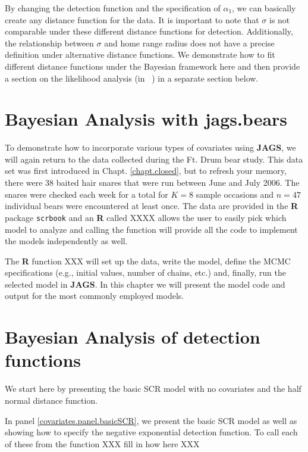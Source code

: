 By changing the detection function and the specification of
$\alpha_1$, we can basically create any distance function for the
data. It is important to note that $\sigma$ is not comparable under
these different distance functions for detection.  Additionally, the
relationship between $\sigma$ and home range radius does not have
a precise definition under alternative distance functions.  We
demonstrate how to fit different distance functions under the Bayesian framework here
and then provide a section on the likelihood analysis (in \secr~) in a 
separate section below.

\section{Bayesian Analysis with jags.bears}

To demonstrate how to incorporate various types of covariates using
{\bf JAGS}, we will again return to the data collected during the
Ft. Drum bear study.  This data set was first introduced in Chapt. \ref{chapt.closed},
but to refresh your memory, there were 38 baited hair snares that were run
between June and July 2006.  The snares were checked each week for a
total for $K=8$ sample occasions and $n=47$ individual bears were
encountered at least once.  The data are provided in the {\bf R}
package \mbox{\tt scrbook} and an {\bf R} called XXXX allows the user to easily
pick which model to analyze and calling the function will provide all the code to 
implement the models independently as well.

 The {\bf R} function XXX  
will set up the data, write the model, define the MCMC specifications 
(e.g., initial values, number of chains, etc.) and, finally, 
run the selected model in {\bf JAGS}.  In this chapter we will present the 
model code and output for the most commonly employed models.  

\section{Bayesian Analysis of detection functions}
We start here by presenting the basic SCR model with no covariates and
the half normal distance function.

In panel \ref{covariates.panel.basicSCR}, 
we present the basic SCR model as well as showing how to specify
the negative exponential detection function.  To call each of these from the function XXX
fill in how here XXX  

